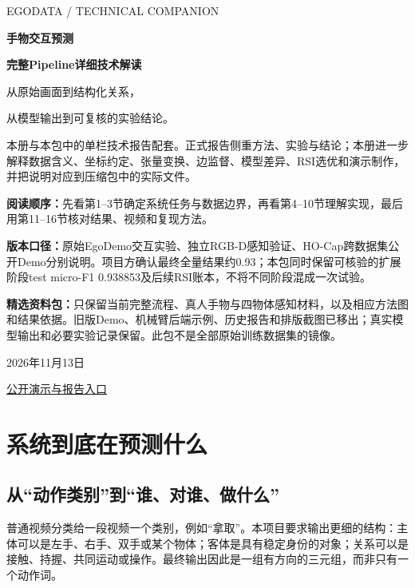 \documentclass[11pt,a4paper,UTF8,fontset=fandol]{ctexart}
\begin{document}
\begin{titlepage}
\vspace*{1.5cm}
{\color{green}\large EGODATA / TECHNICAL COMPANION}\par\vspace{.8cm}
{\Huge\bfseries\color{ink}手物交互预测}\par\vspace{.35cm}
{\LARGE\bfseries 完整Pipeline详细技术解读}\par\vspace{.6cm}
{\Large 从原始画面到结构化关系，\par 从模型输出到可复核的实验结论。}\par\vspace{1.3cm}
本册与本包中的单栏技术报告配套。正式报告侧重方法、实验与结论；本册进一步解释数据含义、坐标约定、张量变换、边监督、模型差异、RSI选优和演示制作，并把说明对应到压缩包中的实际文件。

\vspace{.4cm}
\textbf{阅读顺序：}先看第1--3节确定系统任务与数据边界，再看第4--10节理解实现，最后用第11--16节核对结果、视频和复现方法。

\textbf{版本口径：}原始EgoDemo交互实验、独立RGB-D感知验证、HO-Cap跨数据集公开Demo分别说明。项目方确认最终全量结果约0.93；本包同时保留可核验的扩展阶段test micro-F1 0.938853及后续RSI账本，不将不同阶段混成一次试验。

\textbf{精选资料包：}只保留当前完整流程、真人手物与四物体感知材料，以及相应方法图和结果依据。旧版Demo、机械臂后端示例、历史报告和排版截图已移出；真实模型输出和必要实验记录保留。此包不是全部原始训练数据集的镜像。

\vfill
{\large 2026年11月13日}\par
\href{https://egodata-full-pipeline-demo.miracle-techlink.chatgpt.site}{公开演示与报告入口}
\end{titlepage}
\tableofcontents\clearpage

\section{系统到底在预测什么}
\subsection{从“动作类别”到“谁、对谁、做什么”}
普通视频分类给一段视频一个类别，例如“拿取”。本项目要求输出更细的结构：主体可以是左手、右手、双手或某个物体；客体是具有稳定身份的对象；关系可以是接触、持握、共同运动或操作。最终输出因此是一组有方向的三元组，而非只有一个动作词。
\end{document}

